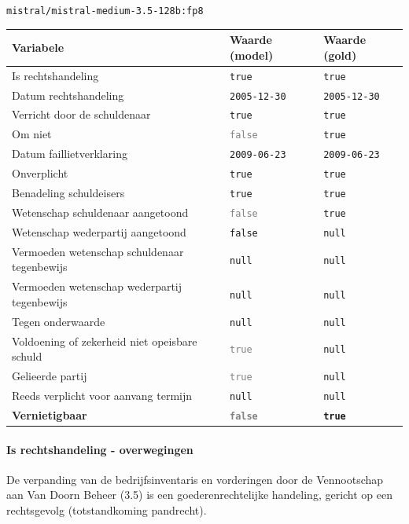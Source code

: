\documentclass[
  dutch,
  a4paper,
]{article}
\begin{document}
\texttt{mistral/mistral-medium-3.5-128b:fp8}

\begin{center}
\small
\begin{tabular}{@{}p{7.4cm}p{2.6cm}p{2.6cm}@{}}
\toprule
Variabele & Waarde (model) & Waarde (gold) \\
\midrule
Is rechtshandeling & \texttt{true} & \texttt{true} \\
Datum rechtshandeling & \texttt{2005-12-30} & \texttt{2005-12-30} \\
Verricht door de schuldenaar & \texttt{true} & \texttt{true} \\
Om niet & \textcolor{gray}{\texttt{false}} & \texttt{true} \\
Datum faillietverklaring & \texttt{2009-06-23} & \texttt{2009-06-23} \\
Onverplicht & \texttt{true} & \texttt{true} \\
Benadeling schuldeisers & \texttt{true} & \texttt{true} \\
Wetenschap schuldenaar aangetoond & \textcolor{gray}{\texttt{false}} & \texttt{true} \\
Wetenschap wederpartij aangetoond & \texttt{false} & \texttt{null} \\
Vermoeden wetenschap schuldenaar tegenbewijs & \texttt{null} & \texttt{null} \\
Vermoeden wetenschap wederpartij tegenbewijs & \texttt{null} & \texttt{null} \\
Tegen onderwaarde & \texttt{null} & \texttt{null} \\
Voldoening of zekerheid niet opeisbare schuld & \textcolor{gray}{\texttt{true}} & \texttt{null} \\
Gelieerde partij & \textcolor{gray}{\texttt{true}} & \texttt{null} \\
Reeds verplicht voor aanvang termijn & \texttt{null} & \texttt{null} \\
\textbf{Vernietigbaar} & \textbf{\textcolor{gray}{\texttt{false}}} & \textbf{\texttt{true}} \\
\bottomrule
\end{tabular}
\end{center}

\paragraph{Is rechtshandeling - overwegingen}\label{is-rechtshandeling---overwegingen-3}

De verpanding van de bedrijfsinventaris en vorderingen door de Vennootschap aan Van Doorn Beheer (3.5) is een goederenrechtelijke handeling, gericht op een rechtsgevolg (totstandkoming pandrecht).
\end{document}
